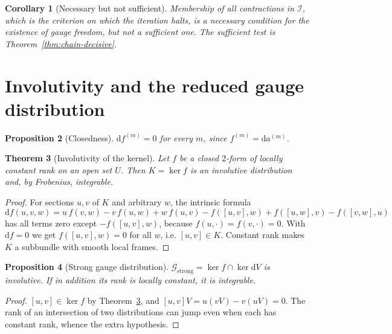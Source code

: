 \documentclass[12pt]{article}
\theoremstyle{plain}
\newtheorem{theorem}{Theorem}[section]
\newtheorem{proposition}[theorem]{Proposition}
\newtheorem{corollary}[theorem]{Corollary}
\theoremstyle{definition}
\theoremstyle{remark}
\newcommand{\dd}{\mathrm{d}}
\newcommand{\Ical}{\mathcal{I}}
\begin{document}
	\begin{corollary}[Necessary but not sufficient]
		\label{cor:necsuf}
		Membership of all contractions in $\Ical$, which is the criterion on which the
		iteration halts, is a necessary condition for the existence of gauge freedom,
		but not a sufficient one. The sufficient test is
		Theorem~\ref{thm:chain-decisive}.
	\end{corollary}
	
	\section{Involutivity and the reduced gauge distribution}
	\label{sec:involutivity}
	
	\begin{proposition}[Closedness]
		\label{prop:closed}
		$\dd f^{(m)}=0$ for every $m$, since $f^{(m)}=\dd a^{(m)}$.
	\end{proposition}
	
	\begin{theorem}[Involutivity of the kernel]
		\label{thm:frobenius}
		Let $f$ be a closed $2$-form of locally constant rank on an open set $U$. Then
		$K=\ker f$ is an involutive distribution and, by Frobenius, integrable.
	\end{theorem}
	
	\begin{proof}
		For sections $u,v$ of $K$ and arbitrary $w$, the intrinsic formula
		\[
		\dd f(u,v,w)=u\,f(v,w)-v\,f(u,w)+w\,f(u,v)
		-f([u,v],w)+f([u,w],v)-f([v,w],u)
		\]
		has all terms zero except $-f([u,v],w)$, because $f(u,\cdot)=f(v,\cdot)=0$. With
		$\dd f=0$ we get $f([u,v],w)=0$ for all $w$, i.e. $[u,v]\in K$. Constant rank
		makes $K$ a subbundle with smooth local frames.
	\end{proof}
	
	\begin{proposition}[Strong gauge distribution]
		\label{prop:stronginv}
		$\mathcal{G}_{\mathrm{strong}}=\ker f\cap\ker\dd V$ is involutive. If in addition
		its rank is locally constant, it is integrable.
	\end{proposition}
	
	\begin{proof}
		$[u,v]\in\ker f$ by Theorem~\ref{thm:frobenius}, and
		$[u,v]V=u(vV)-v(uV)=0$. The rank of an intersection of two distributions can
		jump even when each has constant rank, whence the extra hypothesis.
	\end{proof}
	
\end{document}
